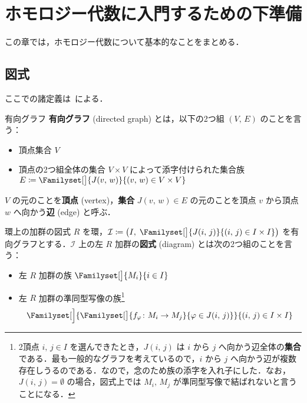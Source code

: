 \documentclass[algtopo_main]{subfiles}
\begin{document}
\setcounter{chapter}{0}

\chapter{ホモロジー代数に入門するための下準備}

この章では，ホモロジー代数について基本的なことをまとめる．

\section{図式}

ここでの諸定義は~\cite[1.2節]{Shiho}による．

\begin{mydef}[label=def:DG]{有向グラフ}
	\textbf{有向グラフ} (directed graph) とは，以下の2つ組 $(V,\, E)$ のことを言う：
	\begin{itemize}
		\item 頂点集合 $V$
		\item 頂点の2つ組全体の集合 $V \times V$ によって添字付けられた集合族 $E \coloneqq \Familyset[\big]{J(v,\, w)}{(v,\, w) \in V \times V}$
	\end{itemize}
	$V$ の元のことを\textbf{頂点} (vertex)，\textbf{集合} $J(v,\, w) \in E$ の元のことを頂点 $v$ から頂点 $w$ へ向かう\textbf{辺} (edge) と呼ぶ．
\end{mydef}

\begin{mydef}[label=def:diagram]{環上の加群の図式}
	$R$ を環，$\mathcal{I} \coloneqq \bigl(I,\; \Familyset[\big]{J(i,\, j)}{(i,\, j) \in I \times I}\bigr)$ を有向グラフとする．$\mathcal{I}$ 上の左 $R$ 加群の\textbf{図式} (diagram) とは次の2つ組のことを言う：
	\begin{itemize}
		\item 左 $R$ 加群の族 $\Familyset[\big]{M_i}{i \in I}$
		\item 左 $R$ 加群の準同型写像の族\footnote{2頂点 $i,\, j \in I$ を選んできたとき，$J(i,\, j)$ は $i$ から $j$ へ向かう辺全体の\textbf{集合}である．最も一般的なグラフを考えているので，$i$ から $j$ へ向かう辺が複数存在しうるのである．なので，念のため族の添字を入れ子にした．なお，$J(i,\, j) = \emptyset$ の場合，図式上では $M_i,\, M_j$ が準同型写像で結ばれないと言うことになる．}
		\begin{align}
			\Familyset[\Big]{\Familyset[\big]{f_\varphi \colon M_i \to M_j}{\varphi \in J(i,\, j)}}{(i,\, j) \in I \times I}
		\end{align}
	\end{itemize}
\end{mydef}
\end{document}
